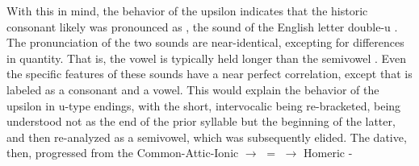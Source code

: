 With this in mind, the behavior of the upsilon  indicates
that the historic consonant likely was pronounced as ,
the sound of the English letter double-u . 
The pronunciation of the two sounds are near-identical, excepting
for differences in quantity. That is, the vowel  is typically
held longer than the semivowel . Even the specific features
of these sounds have a near perfect correlation,
except that  is labeled as a consonant and  a vowel.
This would explain the behavior of the upsilon  in u-type
endings, with the short, intervocalic  being re-bracketed, being
understood not as the end of the prior syllable but the beginning of the
latter, and then re-analyzed as a semivowel, which was subsequently elided.
The dative, then, progressed from the Common-Attic-Ionic
 $\to$
 $=$
 $\to$ Homeric
-


